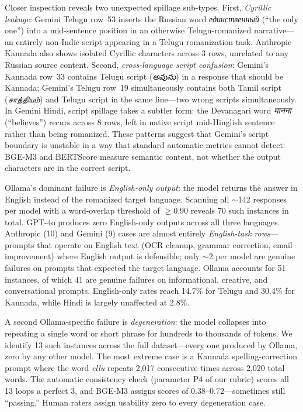 Closer inspection reveals two unexpected spillage sub-types. First,
\emph{Cyrillic leakage}: Gemini Telugu row~53 inserts the Russian word
\emph{единственный} (``the only one'') into a mid-sentence position in an
otherwise Telugu-romanized narrative---an entirely non-Indic script appearing
in a Telugu romanization task. Anthropic Kannada also shows isolated Cyrillic
characters across 3 rows, unrelated to any Russian source content. Second,
\emph{cross-language script confusion}: Gemini's Kannada row~33 contains
Telugu script (\emph{అవును}) in a response that should be Kannada; Gemini's
Telugu row~19 simultaneously contains both Tamil script (\emph{சாத்தியம்}) and
Telugu script in the same line---two wrong scripts simultaneously. In Gemini
Hindi, script spillage takes a subtler form: the Devanagari word
\emph{मानना} (``believes'') recurs across 8 rows, left in native script
mid-Hinglish sentence rather than being romanized. These patterns suggest that
Gemini's script boundary is unstable in a way that standard automatic metrics
cannot detect: BGE-M3 and BERTScore measure semantic content, not whether the
output characters are in the correct script.

Ollama's dominant failure is \emph{English-only output}: the model returns the
answer in English instead of the romanized target language. Scanning all
$\sim$142 responses per model with a word-overlap threshold of $\geq$0.90
reveals 70 such instances in total. GPT-4o produces zero English-only outputs
across all three languages. Anthropic (10) and Gemini (9) cases are almost
entirely \emph{English-task rows}---prompts that operate on English text (OCR
cleanup, grammar correction, email improvement) where English output is
defensible; only $\sim$2 per model are genuine failures on prompts that
expected the target language. Ollama accounts for 51 instances, of which 41
are genuine failures on informational, creative, and conversational prompts.
English-only rates reach 14.7\% for Telugu and 30.4\% for Kannada, while
Hindi is largely unaffected at 2.8\%.

A second Ollama-specific failure is \emph{degeneration}: the model collapses
into repeating a single word or short phrase for hundreds to thousands of
tokens. We identify 13 such instances across the full dataset---every one
produced by Ollama, zero by any other model. The most extreme case is a Kannada
spelling-correction prompt where the word \emph{ellu} repeats 2,017
consecutive times across 2,020 total words. The automatic consistency check
(parameter P4 of our rubric) scores all 13 loops a perfect 3, and BGE-M3
assigns scores of 0.38--0.72---sometimes still ``passing.'' Human raters
assign usability zero to every degeneration case.

